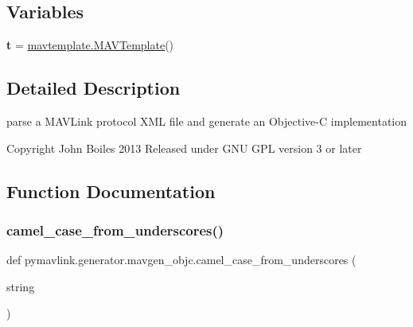 \subsection*{Variables}
\begin{DoxyCompactItemize}
\item 
\mbox{\label{namespacepymavlink_1_1generator_1_1mavgen__objc_a379787c6cbc3c99a94724d25039c0fbf}} 
{\bfseries t} = \hyperlink{classpymavlink_1_1generator_1_1mavtemplate_1_1MAVTemplate}{mavtemplate.\+M\+A\+V\+Template}()
\end{DoxyCompactItemize}


\subsection{Detailed Description}
\begin{DoxyVerb}parse a MAVLink protocol XML file and generate an Objective-C implementation

Copyright John Boiles 2013
Released under GNU GPL version 3 or later
\end{DoxyVerb}
 

\subsection{Function Documentation}
\mbox{\label{namespacepymavlink_1_1generator_1_1mavgen__objc_aadc6040b4b644298ef796c16cdabb42c}} 
\subsubsection{\texorpdfstring{camel\+\_\+case\+\_\+from\+\_\+underscores()}{camel\_case\_from\_underscores()}}
{\footnotesize\ttfamily def pymavlink.\+generator.\+mavgen\+\_\+objc.\+camel\+\_\+case\+\_\+from\+\_\+underscores (\begin{DoxyParamCaption}\item[{}]{string }\end{DoxyParamCaption})}

